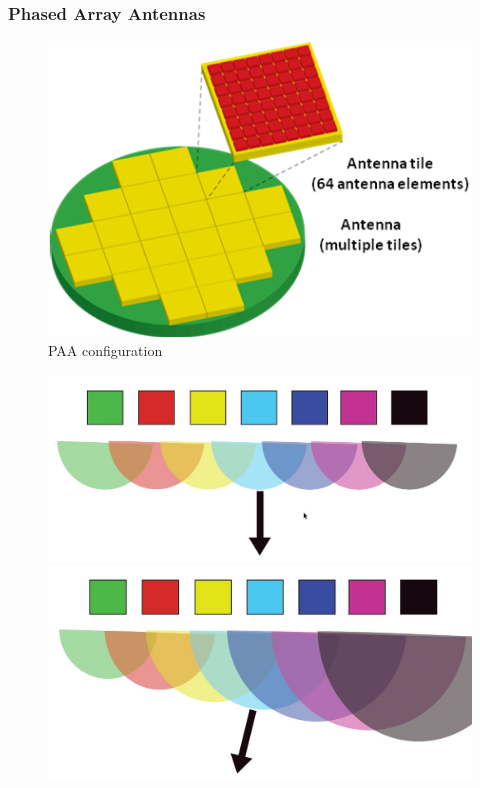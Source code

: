 \documentclass{beamer}
\begin{document}
\begin{frame}\frametitle{Phased Array Antennas}
		\begin{figure}
			\centering
			\includegraphics[width=0.3\linewidth]{images/satrax_antenna}
			\caption{PAA configuration}
			\label{fig:satrax_antenna}
		\end{figure}
		\begin{figure}[H]
			\begin{minipage}[t]{0.45\textwidth}
				\centering
				\includegraphics[width=\linewidth]{images/paa_straight}
			\end{minipage}
				\hspace{\fill}
			\begin{minipage}[t]{0.45\textwidth}
				\centering
				\includegraphics[width=\linewidth]{images/paa_bend}
			\end{minipage}
		\end{figure}
\end{frame}
\end{document}
